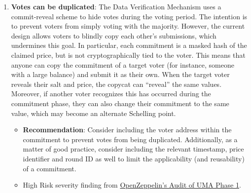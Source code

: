 \begin{enumerate}
\item\textbf{Votes can be duplicated}: The Data Verification Mechanism uses a commit-reveal scheme to hide votes during the voting period. The intention is to prevent voters from simply voting with the majority. However, the current design allows voters to blindly copy each other’s submissions, which undermines this goal. In particular, each commitment is a masked hash of the claimed price, but is not cryptographically tied to the voter. This means that anyone can copy the commitment of a target voter (for instance, someone with a large balance) and submit it as their own. When the target voter reveals their salt and price, the copycat can “reveal” the same values. Moreover, if another voter recognizes this has occurred during the commitment phase, they can also change their commitment to the same value, which may become an alternate Schelling point.
	\begin{itemize}
	\item\textbf{Recommendation}: Consider including the voter address within the commitment to prevent votes from being duplicated. Additionally, as a matter of good practice, consider including the relevant timestamp, price identifier and round ID as well to limit the applicability (and reusability) of a commitment.
	\item High Risk severity finding from \href{https://blog.openzeppelin.com/uma-audit-phase-1/}{OpenZeppelin’s Audit of UMA Phase 1}.
	\end{itemize}

\end{enumerate}
